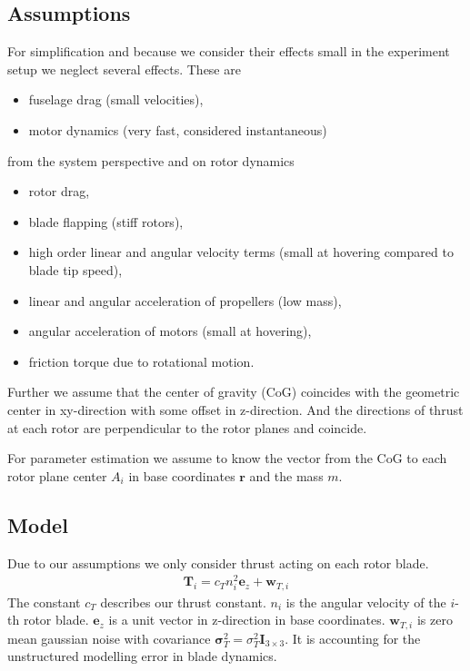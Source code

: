 \documentclass[10pt,a4paper]{article}
\begin{document}
\subsection*{Assumptions}
For simplification and because we consider their effects small in the experiment setup we neglect several effects. These are 
\begin{itemize} 
\item fuselage drag (small velocities),
\item motor dynamics (very fast, considered instantaneous)
\end{itemize}
from the system perspective and on rotor dynamics
\begin{itemize}
\item rotor drag,
\item blade flapping (stiff rotors),
\item high order linear and angular velocity terms (small at hovering compared to blade tip speed),
\item linear and angular acceleration of propellers (low mass),
\item angular acceleration of motors (small at hovering),
\item friction torque due to rotational motion.
\end{itemize}
Further we assume that the center of gravity (CoG) coincides with the geometric center in xy-direction with some offset in z-direction. And the directions of thrust at each rotor are perpendicular to the rotor planes and coincide.

For parameter estimation we assume to know the vector from the CoG  to each rotor plane center $A_i$ in base coordinates $\mathbf{r}$ and the mass $m$.

\subsection*{Model}
Due to our assumptions we only consider thrust acting on each rotor blade. 
\begin{align}
\mathbf{T}_{i} = c_T n_i^2 \mathbf{e}_z + \mathbf{w}_{T,i}
\end{align}   
The constant $c_T$ describes our thrust constant. $n_i$ is the angular velocity of the $i$-th rotor blade. $\mathbf{e}_z$ is a unit vector in z-direction in base coordinates. $\mathbf{w}_{T,i}$ is zero mean gaussian noise with covariance $\boldsymbol{\sigma}_T^2 = \sigma_T^2 \mathbf{I}_{3\times3}$. It is accounting for the unstructured modelling error in blade dynamics.
\end{document}
